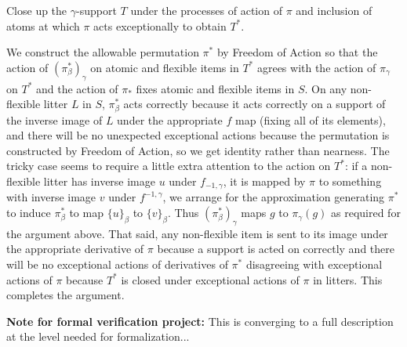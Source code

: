\documentclass[112pt]{article}
\begin{document}
Close up the $\gamma$-support $T$ under the processes of action of $\pi$ and inclusion of atoms at which $\pi$ acts exceptionally to obtain $T^*$.

We construct the allowable permutation $\pi^*$ by Freedom of Action so that the action of $(\pi^*_\beta)_\gamma$ on atomic and flexible items in $T^*$ agrees with the action of $\pi_\gamma$ on $T^*$
and the action of $\pi_*$ fixes atomic and flexible items in $S$.  On any non-flexible litter $L$ in $S$, $\pi^*_\beta$ acts correctly because it acts correctly on a support of the inverse image of $L$ under the appropriate $f$ map (fixing all of its elements), and there will be no unexpected exceptional actions because the permutation is constructed by Freedom of Action, so we get identity rather than nearness.
The tricky case seems to require a little extra attention to the action on $T^*$:  if a non-flexible litter has inverse image $u$ under $f_{-1,\gamma}$, it is mapped by $\pi$ to something with inverse image $v$ under $f^{-1,\gamma}$, we arrange for the
approximation generating $\pi^*$ to induce
$\pi^*_\beta$ to map $\{u\}_\beta$ to $\{v\}_\beta$.  Thus  $(\pi^*_\beta)_\gamma$ maps $g$ to $\pi_\gamma(g)$ as required for the argument above.  That said, any non-flexible item is sent to its image under the appropriate derivative of $\pi$ because
a support is acted on correctly and there will be no exceptional actions of derivatives of $\pi^*$ disagreeing with exceptional actions of $\pi$ because $T^*$ is closed under exceptional actions of $\pi$ in litters.  This completes the argument.

\begin{comment}
NOTE:  Difficult interactions with $S$ are avoided because an incompatibility of $\pi$ with fixing $S$ would involve moving most elements of a litter in the range of $f_{-1,\beta}$, and while $\pi$ may do this, nothing in the definition
of $\pi^*$ can force this to happen;  there is no conflict between the conditions imposed by $S$ and the conditions imposed by $T^*$.
\end{comment}














{\bf Note for formal verification project:}  This is converging to a full description at the level needed for formalization...
\end{document}

